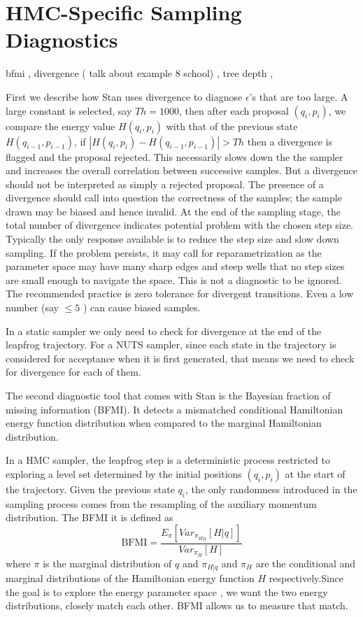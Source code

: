 \documentclass[]{report}
\begin{document}
\section{HMC-Specific Sampling Diagnostics}
bfmi , divergence ( talk about example 8 school) , tree depth ,

First we describe how Stan uses
divergence to diagnose $\epsilon$'s that are too large. A large constant
is selected, say $Th = 1000$, then after each proposal $(q_i,p_i)$, we compare the
energy value $H(q_i,p_i)$ with that of the previous state $H(q_{i-1},p_{i-1})$,
if $|H(q_i,p_i) - H(q_{i-1},p_{i-1})|> Th$ then a divergence is flagged and the
proposal rejected. This necessarily slows down the the sampler and increases the overall correlation between successive samples. But a divergence should not be interpreted as simply a rejected proposal. The presence of a divergence should call into question the correctness of the samples; the sample
drawn may be biased and hence invalid.
 At the end of the sampling stage, the total number of
divergence indicates potential problem with the chosen step size. Typically the
only response available is to reduce the step size and slow down sampling.
If the problem persists, it may call for reparametrization as the parameter
space may have many sharp edges and steep wells that no step sizes are small
enough to navigate the space.  This is not a diagnostic to be ignored. The recommended practice is zero tolerance for divergent transitions. Even a low number (say $\le 5 $ ) can cause biased samples.

In a static sampler we only need to check for divergence at the end of the leapfrog trajectory. For a NUTS sampler, since each state in the trajectory is considered for acceptance when it is first generated, that means we need to check for divergence for each of them. 


The second diagnostic tool that comes with Stan is the Bayesian fraction of
missing information (BFMI). It detects a mismatched conditional Hamiltonian
energy function
distribution when compared to the marginal Hamiltonian distribution. 

In a HMC sampler, the leapfrog step is a deterministic process
restricted to exploring a level set determined by the 
initial positions $(q_i,p_i)$ at the start of the trajectory. Given the previous 
state $q_i$, the only randomness introduced in the sampling process comes from the resampling of the auxiliary
momentum distribution.  The BFMI it is defined as 
\[ \text{BFMI} = \frac{ E_\pi[Var_{\pi_{H|q}}[H|q]]}{Var_{\pi_H}[H]} \]
where $\pi$ is the marginal distribution of $q$ and $\pi_{H|q}$ and $\pi_{H}$
are the conditional and marginal distributions of the Hamiltonian energy
function $H$ respectively.Since the goal is
to explore the energy parameter space , we want the two energy distributions, 
closely match each other. BFMI allows us to measure that match.
\end{document}
